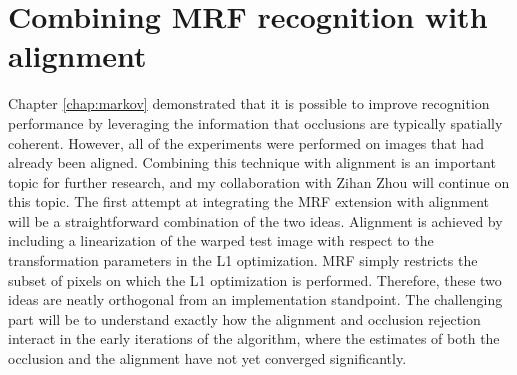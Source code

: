 

\section{Combining MRF recognition with alignment} Chapter \ref{chap:markov}
demonstrated that it is possible to improve recognition performance by
leveraging the information that occlusions are typically spatially coherent.
However, all of the experiments were performed on images that had already been
aligned.  Combining this technique with alignment is an important topic for
further research, and my collaboration with Zihan Zhou will continue on this
topic.  The first attempt at integrating the MRF extension with alignment will
be a straightforward combination of the two ideas.  Alignment is achieved by
including a linearization of the warped test image with respect to the
transformation parameters in the L1 optimization.  MRF simply restricts the
subset of pixels on which the L1 optimization is performed.  Therefore, these
two ideas are neatly orthogonal from an implementation standpoint.  The
challenging part will be to understand exactly how the alignment and occlusion
rejection interact in the early iterations of the algorithm, where the
estimates of both the occlusion and the alignment have not yet converged
significantly.


